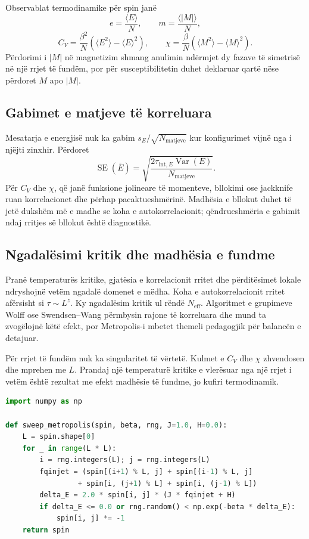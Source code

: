 \documentclass[11pt,oneside,openany]{book}
\newcommand{\Var}{\operatorname{Var}}
\begin{document}
Observablat termodinamike për spin janë
\begin{equation}
 e=\frac{\langle E\rangle}{N},\qquad
 m=\frac{\langle |M|\rangle}{N},
\end{equation}
\begin{equation}
 C_V=\frac{\beta^2}{N}\left(\langle E^2\rangle-\langle E\rangle^2\right),
 \qquad
 \chi=\frac{\beta}{N}\left(\langle M^2\rangle-\langle M\rangle^2\right).
\end{equation}
Përdorimi i $|M|$ në magnetizim shmang anulimin ndërmjet dy fazave të simetrisë në një rrjet të fundëm, por për susceptibilitetin duhet deklaruar qartë nëse përdoret $M$ apo $|M|$.

\subsection{Gabimet e matjeve të korreluara}
Mesatarja e energjisë nuk ka gabim $s_E/\sqrt{N_{\mathrm{matjeve}}}$ kur konfigurimet vijnë nga i njëjti zinxhir. Përdoret
\begin{equation}
 \operatorname{SE}(\overline E)=
 \sqrt{\frac{2\tau_{\mathrm{int},E}\Var(E)}{N_{\mathrm{matjeve}}}}.
\end{equation}
Për $C_V$ dhe $\chi$, që janë funksione jolineare të momenteve, bllokimi ose jackknife ruan korrelacionet dhe përhap pacaktueshmërinë. Madhësia e bllokut duhet të jetë dukshëm më e madhe se koha e autokorrelacionit; qëndrueshmëria e gabimit ndaj rritjes së bllokut është diagnostikë.

\subsection{Ngadalësimi kritik dhe madhësia e fundme}
Pranë temperaturës kritike, gjatësia e korrelacionit rritet dhe përditësimet lokale ndryshojnë vetëm ngadalë domenet e mëdha. Koha e autokorrelacionit rritet afërsisht si $\tau\sim L^z$. Ky ngadalësim kritik ul rëndë $N_{\mathrm{eff}}$. Algoritmet e grupimeve Wolff ose Swendsen--Wang përmbysin rajone të korreluara dhe mund ta zvogëlojnë këtë efekt, por Metropolis-i mbetet themeli pedagogjik për balancën e detajuar.

Për rrjet të fundëm nuk ka singularitet të vërtetë. Kulmet e $C_V$ dhe $\chi$ zhvendosen dhe mprehen me $L$. Prandaj një temperaturë kritike e vlerësuar nga një rrjet i vetëm është rezultat me efekt madhësie të fundme, jo kufiri termodinamik.

\begin{lstlisting}[language=Python,caption={Një sweep Metropolis për modelin Ising.}]
import numpy as np

def sweep_metropolis(spin, beta, rng, J=1.0, H=0.0):
    L = spin.shape[0]
    for _ in range(L * L):
        i = rng.integers(L); j = rng.integers(L)
        fqinjet = (spin[(i+1) % L, j] + spin[(i-1) % L, j]
                 + spin[i, (j+1) % L] + spin[i, (j-1) % L])
        delta_E = 2.0 * spin[i, j] * (J * fqinjet + H)
        if delta_E <= 0.0 or rng.random() < np.exp(-beta * delta_E):
            spin[i, j] *= -1
    return spin
\end{lstlisting}
\end{document}
